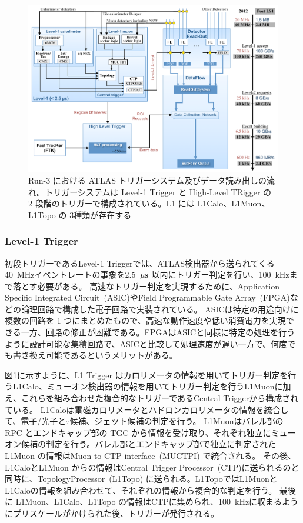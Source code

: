 \begin{figure}[tb]
  \centering
  \includegraphics[clip, width=14cm]{fig/3/trigger-nagare2.pdf}
  \caption{Run-3 における ATLAS トリガーシステム及びデータ読み出しの流れ\cite{article:Run3trigger}。トリガーシステムは Level-1 Trigger と High-Level TRigger の 2 段階のトリガーで構成されている。L1 には L1Calo、L1Muon、L1Topo の 3種類が存在する}
  \label{fig:トリガーの全体像}
\end{figure}

\subsubsection{Level-1 Trigger}\label{L1Topo}
初段トリガーであるLevel-1 Triggerでは、ATLAS検出器から送られてくる40~MHzイベントレートの事象を2.5~$\rm{\mu s}$ 以内にトリガー判定を行い、100~kHzまで落とす必要がある。
高速なトリガー判定を実現するために、Application Specific Integrated Circuit~(ASIC)やField Programmable Gate Array~(FPGA)などの論理回路で構成した電子回路で実装されている。
ASICは特定の用途向けに複数の回路を 1 つにまとめたもので、高速な動作速度や低い消費電力を実現できる一方、回路の修正が困難である。FPGAはASICと同様に特定の処理を行うように設計可能な集積回路で、ASICと比較して処理速度が遅い一方で、何度でも書き換え可能であるというメリットがある。

図\ref{fig:トリガーの全体像}に示すように、L1 Trigger はカロリメータの情報を用いてトリガー判定を行うL1Calo、ミューオン検出器の情報を用いてトリガー判定を行うL1Muonに加え、これらを組み合わせた複合的なトリガーであるCentral Triggerから構成されている。
L1Caloは電磁カロリメータとハドロンカロリメータの情報を統合して、電子/光子と$\tau$候補、ジェット候補の判定を行う。
L1Muonはバレル部の RPC とエンドキャップ部の TGC から情報を受け取り、それぞれ独立にミューオン候補の判定を行う。バレル部とエンドキャップ部で独立に判定された L1Muon の情報はMuon-to-CTP interface~(MUCTPI) で統合される。
その後、L1CaloとL1Muon からの情報はCentral Trigger Processor~(CTP)に送られるのと同時に、TopologyProcessor~(L1Topo) に送られる。L1TopoではL1MuonとL1Caloの情報を組み合わせて、それぞれの情報から複合的な判定を行う。
最後に L1Muon、L1Calo、L1Topo の情報はCTPに集められ、100~kHzに収まるようにプリスケールがかけられた後、トリガーが発行される。

